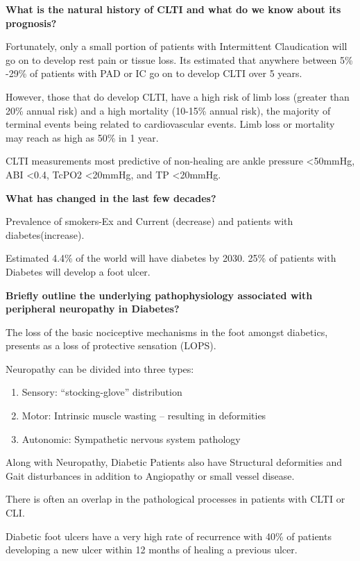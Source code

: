\documentclass[
]{book}
\begin{document}
\textbf{What is the natural history of CLTI and what do we know about its
prognosis?}

Fortunately, only a small portion of patients with Intermittent
Claudication will go on to develop rest pain or tissue loss. Its
estimated that anywhere between 5\% -29\% of patients with PAD or IC go on
to develop CLTI over 5 years.

However, those that do develop CLTI, have a high risk of limb loss
(greater than 20\% annual risk) and a high mortality (10-15\% annual
risk), the majority of terminal events being related to cardiovascular
events. Limb loss or mortality may reach as high as 50\% in 1 year.
\citep{adam2005, norgren2007}

CLTI measurements most predictive of non-healing are ankle pressure
\textless50mmHg, ABI \textless0.4, TcPO2 \textless20mmHg, and TP
\textless20mmHg.\citep{gerhard-herman2017, wickström2017}

\textbf{What has changed in the last few decades?}

Prevalence of smokers-Ex and Current (decrease) and patients with
diabetes(increase).

Estimated 4.4\% of the world will have diabetes by 2030. 25\% of patients
with Diabetes will develop a foot ulcer.

\textbf{Briefly outline the underlying pathophysiology associated with
peripheral neuropathy in Diabetes?}

The loss of the basic nociceptive mechanisms in the foot amongst
diabetics, presents as a loss of protective sensation (LOPS).

Neuropathy can be divided into three types:

\begin{enumerate}
\def\labelenumi{\arabic{enumi}.}
\item
  Sensory: ``stocking-glove'' distribution
\item
  Motor: Intrinsic muscle wasting -- resulting in deformities
\item
  Autonomic: Sympathetic nervous system pathology
\end{enumerate}

Along with Neuropathy, Diabetic Patients also have Structural
deformities and Gait disturbances in addition to Angiopathy or small
vessel disease.

There is often an overlap in the pathological processes in patients with
CLTI or CLI.

Diabetic foot ulcers have a very high rate of recurrence with 40\% of
patients developing a new ulcer within 12 months of healing a previous
ulcer. \citep{armstrong2017}
\end{document}
